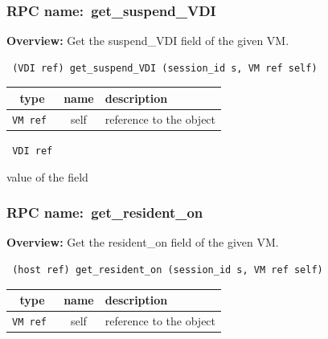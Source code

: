 \vspace{0.3cm}
\vspace{0.3cm}
\vspace{0.3cm}
\subsubsection{RPC name:~get\_suspend\_VDI}

{\bf Overview:} 
Get the suspend\_VDI field of the given VM.

\begin{verbatim} (VDI ref) get_suspend_VDI (session_id s, VM ref self)\end{verbatim}



 
\vspace{0.3cm}
\begin{tabular}{|c|c|p{7cm}|}
 \hline
{\bf type} & {\bf name} & {\bf description} \\ \hline
{\tt VM ref } & self & reference to the object \\ \hline 

\end{tabular}

\vspace{0.3cm}

{\tt 
VDI ref
}


value of the field
\vspace{0.3cm}
\vspace{0.3cm}
\vspace{0.3cm}
\subsubsection{RPC name:~get\_resident\_on}

{\bf Overview:} 
Get the resident\_on field of the given VM.

\begin{verbatim} (host ref) get_resident_on (session_id s, VM ref self)\end{verbatim}



 
\vspace{0.3cm}
\begin{tabular}{|c|c|p{7cm}|}
 \hline
{\bf type} & {\bf name} & {\bf description} \\ \hline
{\tt VM ref } & self & reference to the object \\ \hline 

\end{tabular}

